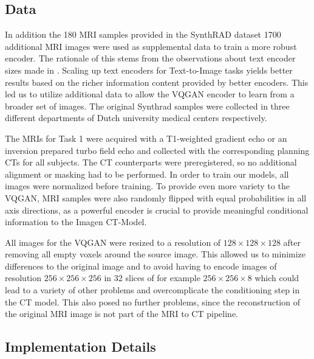 \documentclass{article}
\begin{document}
\subsection{Data}
In addition the 180 MRI samples provided in the SynthRAD dataset 1700 additional MRI images were used as supplemental data to train a more robust encoder. The rationale of this stems from the observations about text encoder sizes made in \cite{ho2022imagen}. Scaling up text encoders for Text-to-Image tasks yields better results based on the richer information content provided by better encoders. This led us to utilize additional data to allow the VQGAN encoder to learn from a broader set of images. The original Synthrad samples were collected in three different departments of Dutch university medical centers respectively. 

The MRIs for Task 1 were acquired with a T1-weighted gradient echo or an inversion prepared turbo field echo and collected with the corresponding planning CTs for all subjects. \cite{synthraddata} The CT counterparts were preregistered, so no additional alignment or masking had to be performed. In order to train our models, all images were normalized before training. To provide even more variety to the VQGAN, MRI samples were also randomly flipped with equal probabilities in all axis directions, as a powerful encoder is crucial to provide meaningful conditional information to the Imagen CT-Model. 

All images for the VQGAN were resized to a resolution of $128\times128\times128$ after removing all empty voxels around the source image. This allowed us to minimize differences to the original image and to avoid having to encode images of resolution $256\times256\times256$ in 32 slices of for example $256\times256\times8$ which could lead to a variety of other problems and overcomplicate the conditioning step in the CT model. This also posed no further problems, since the reconstruction of the original MRI image is not part of the MRI to CT pipeline.

\subsection{Implementation Details}\label{sec:details}
\end{document}
